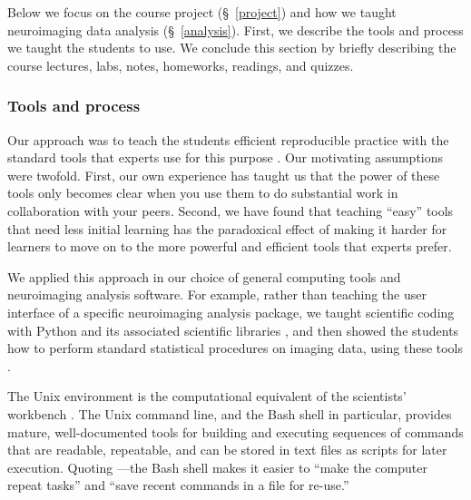Below we focus on the course project (\S~\ref{project}) and
how we taught neuroimaging data analysis (\S~\ref{analysis}).
First, we describe the tools and process we taught the students to use.
We conclude this section by briefly describing the course
lectures, labs, notes, homeworks, readings, and quizzes.

\subsubsection{Tools and process}

Our approach was to teach the students efficient reproducible practice with the
standard tools that experts use for this purpose \citep{millman2014developing}.
Our motivating assumptions were twofold.  First, our own experience has taught
us that the power of these tools only becomes clear when you use them to do
substantial work in collaboration with your peers.  Second, we have found that
teaching ``easy'' tools that need less initial learning has the paradoxical
effect of making it harder for learners to move on to the more powerful and
efficient tools that experts prefer.

We applied this approach in our choice of general computing tools and
neuroimaging analysis software.   For example, rather than teaching the user
interface of a specific neuroimaging analysis package, we taught scientific
coding with Python and its associated scientific libraries
\citep{millman2011python, perez2011python}, and then showed the students how to
perform standard statistical procedures on imaging data, using these tools
\citep{millman2007analysis}.


The Unix environment is the computational equivalent of the scientists'
workbench \citep{preeyanon2014reproducible}.  The Unix command line, and the
Bash shell in particular, provides mature, well-documented tools for building
and executing sequences of commands that are readable, repeatable, and can be
stored in text files as scripts for later execution.  Quoting
\cite{wilson2014best}---the Bash shell makes it easier to ``make the computer
repeat tasks'' and ``save recent commands in a file for re-use.''

